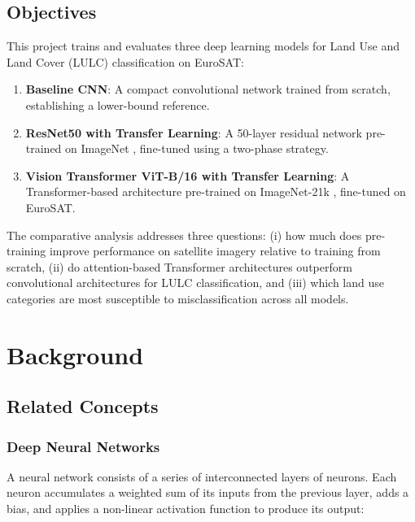 \documentclass[12pt, letterpaper]{article}
\begin{document}
\subsection{Objectives}

This project trains and evaluates three deep learning models for Land Use and Land Cover (LULC) classification on EuroSAT:

\begin{enumerate}
    \item \textbf{Baseline CNN}: A compact convolutional network trained from
          scratch, establishing a lower-bound reference.
    \item \textbf{ResNet50 with Transfer Learning}: A 50-layer residual network
          pre-trained on ImageNet \cite{he2016resnet}, fine-tuned using a two-phase
          strategy.
    \item \textbf{Vision Transformer ViT-B/16 with Transfer Learning}: A
          Transformer-based architecture pre-trained on ImageNet-21k
          \cite{dosovitskiy2021vit}, fine-tuned on EuroSAT.
\end{enumerate}

The comparative analysis addresses three questions: (i) how much does pre-training
improve performance on satellite imagery relative to training from scratch, (ii) do
attention-based Transformer architectures outperform convolutional architectures for
LULC classification, and (iii) which land use categories are most susceptible to
misclassification across all models.

\section{Background}

\subsection{Related Concepts}

\subsubsection{Deep Neural Networks}

A neural network consists of a series of interconnected layers of neurons. Each neuron
accumulates a weighted sum of its inputs from the previous layer, adds a bias, and
applies a non-linear activation function to produce its output:
\end{document}
